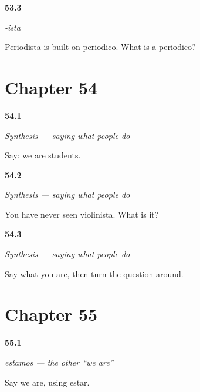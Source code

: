 \noindent\begin{minipage}[t]{\linewidth}
\raggedright
\hypertarget{review-ES-C09-ista-root}{\textbf{53.3}} \emph{-ista}\par
\small Periodista is built on periodico. What is a periodico?
\end{minipage}\par\medskip

\section*{Chapter 54}

\noindent\begin{minipage}[t]{\linewidth}
\raggedright
\hypertarget{review-ES-C09-sintesis-trabajo-we}{\textbf{54.1}} \emph{Synthesis — saying what people do}\par
\small Say: we are students.
\end{minipage}\par\medskip

\noindent\begin{minipage}[t]{\linewidth}
\raggedright
\hypertarget{review-ES-C09-sintesis-trabajo-read}{\textbf{54.2}} \emph{Synthesis — saying what people do}\par
\small You have never seen violinista. What is it?
\end{minipage}\par\medskip

\noindent\begin{minipage}[t]{\linewidth}
\raggedright
\hypertarget{review-ES-C09-sintesis-trabajo-turn}{\textbf{54.3}} \emph{Synthesis — saying what people do}\par
\small Say what you are, then turn the question around.
\end{minipage}\par\medskip

\section*{Chapter 55}

\noindent\begin{minipage}[t]{\linewidth}
\raggedright
\hypertarget{review-ES-C09-estamos-form}{\textbf{55.1}} \emph{estamos — the other \textquotedblleft{}we are\textquotedblright{}}\par
\small Say we are, using estar.
\end{minipage}\par\medskip

